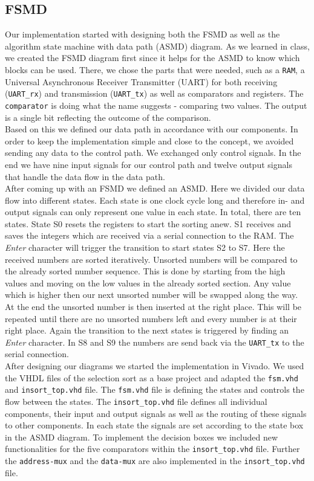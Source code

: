 \documentclass[conference]{IEEEtran}
\begin{document}
\subsection{FSMD}\label{sec:fsmd}
Our implementation started with designing both the FSMD as well as the algorithm state machine with data path (ASMD) diagram. As we learned in class, we created the FSMD diagram first since it helps for the ASMD to know which blocks can be used. There, we chose the parts that were needed, such as a \texttt{RAM}, a Universal Asynchronous Receiver Transmitter (UART) for both receiving (\texttt{UART\_rx}) and transmission (\texttt{UART\_tx}) as well as comparators and registers. The \texttt{comparator} is doing what the name suggests - comparing two values. The output is a single bit reflecting the outcome of the comparison. \\ 
Based on this we defined our data path in accordance with our components. In order to keep the implementation simple and close to the concept, we avoided sending any data to the control path. We exchanged only control signals. In the end we have nine input signals for our control path and twelve output signals that handle the data flow in the data path.\\
After coming up with an FSMD we defined an ASMD. Here we divided our data flow into different states. Each state is one clock cycle long and therefore in- and output signals can only represent one value in each state. In total, there are ten states. State S0 resets the registers to start the sorting anew. S1 receives and saves the integers which are received via a serial connection to the RAM. The \textit{Enter} character will trigger the transition to start states S2 to S7. Here the received numbers are sorted iteratively. Unsorted numbers will be compared to the already sorted number sequence. This is done by starting from the high values and moving on the low values in the already sorted section. Any value which is higher then our next unsorted number will be swapped along the way. At the end the unsorted number is then inserted at the right place. This will be repeated until there are no unsorted numbers left and every number is at their right place. Again the transition to the next states is triggered by finding an \textit{Enter} character. In S8 and S9 the numbers are send back via the \texttt{UART\_tx} to the serial connection. \\
After designing our diagrams we started the implementation in Vivado. We used the VHDL files of the selection sort as a base project and adapted the \texttt{fsm.vhd} and \texttt{insort\_top.vhd} file. The \texttt{fsm.vhd} file is defining the states and controls the flow between the states. The \texttt{insort\_top.vhd} file defines all individual components, their input and output signals as well as the routing of these signals to other components. In each state the signals are set according to the state box in the ASMD diagram. To implement the decision boxes we included new functionalities for the five comparators within the \texttt{insort\_top.vhd} file. Further the \texttt{address-mux} and the \texttt{data-mux} are also implemented in the \texttt{insort\_top.vhd} file.\\
\end{document}
